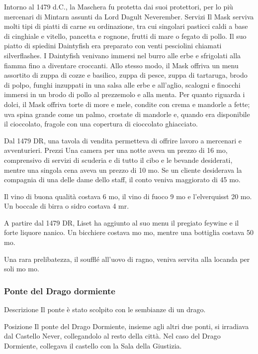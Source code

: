 \documentclass{article}
\begin{document}
Intorno al 1479 d.C., la Maschera fu protetta dai suoi protettori, per lo più mercenari di Mintarn assunti da Lord Dagult Neverember.
Servizi\newline
Il Mask serviva molti tipi di piatti di carne su ordinazione, tra cui singolari pasticci caldi a base di cinghiale e vitello, pancetta e rognone, frutti di mare o fegato di pollo. Il suo piatto di spiedini Daintyfish era preparato con venti pesciolini chiamati silverflashes. I Daintyfish venivano immersi nel burro alle erbe e sfrigolati alla fiamma fino a diventare croccanti. Allo stesso modo, il Mask offriva un menu assortito di zuppa di cozze e basilico, zuppa di pesce, zuppa di tartaruga, brodo di polpo, funghi inzuppati in una salsa alle erbe e all'aglio, scalogni e finocchi immersi in un brodo di pollo al prezzemolo e alla menta. Per quanto riguarda i dolci, il Mask offriva torte di more e mele, condite con crema e mandorle a fette; uva spina grande come un palmo, crostate di mandorle e, quando era disponibile il cioccolato, fragole con una copertura di cioccolato ghiacciato.

Dal 1479 DR, una tavola di vendita permetteva di offrire lavoro a mercenari e avventurieri.
Prezzi\newline
Una camera per una notte aveva un prezzo di 16  mo, comprensivo di servizi di scuderia e di tutto il cibo e le bevande desiderati, mentre una singola cena aveva un prezzo di 10  mo. Se un cliente desiderava la compagnia di una delle dame dello staff, il conto veniva maggiorato di 45  mo.

Il vino di buona qualità costava 6 mo, il vino di fuoco 9 mo e l'elverquisst 20 mo. Un boccale di birra o sidro costava 4 mr.

A partire dal 1479 DR, Liset ha aggiunto al suo menu il pregiato feywine e il forte liquore nanico. Un bicchiere costava mo  mo, mentre una bottiglia costava 50 mo.

Una rara prelibatezza, il soufflé all'uovo di ragno, veniva servita alla locanda per soli mo  mo.
              \subsubsection{Ponte del Drago dormiente}
Descrizione
Il ponte è stato scolpito con le sembianze di un drago.

Posizione
Il ponte del Drago Dormiente, insieme agli altri due ponti, si irradiava dal Castello Never, collegandolo al resto della città. Nel caso del Drago Dormiente, collegava il castello con la Sala della Giustizia.
\end{document}
